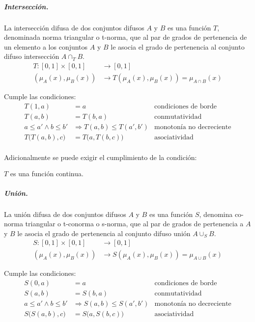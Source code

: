 \documentclass[a5paper,doc,10pt,noapacite]{apa6}
\begin{document}
{{\subparagraph{Intersección.}
La intersección difusa de dos conjuntos difusos \(A\) y \(B\) es una función \(T\), denominada norma triangular o t-norma, que al par de grados de pertenencia de un elemento a los conjuntos \(A\) y \(B\) le asocia el grado de pertenencia al conjunto difuso intersección \(A \cap _T B\).
    \begin{align*}
    T: [0,1] \times [0,1] & \longrightarrow [0,1]\\
    (\mu _A(x), \mu _B(x)) & \longrightarrow T(\mu _A(x), \mu _B(x)) = \mu_{A\cap B} (x)
    \end{align*}

Cumple las condiciones:
\begin{align*}
	T(1,a) &= a 		&	\text{condiciones de borde}	\\
	T(a,b) &= T(b,a) 	&	\text{conmutatividad}			\\
	a \leq a' \wedge b \leq b' &\Rightarrow T(a,b) \leq T(a',b')	&	\text{monotonía no decreciente}			\\
	T\big(T(a,b),c\big) &= T\big(a, T(b,c)\big)	&		\text{asociatividad}			\\
\end{align*}

    
Adicionalmente se puede exigir el cumplimiento de la condición:

\begin{center}
	\(T\) es una función continua.
\end{center}

\subparagraph{Unión.}

La unión difusa de dos conjuntos difusos \(A\) y \(B\) es una función \(S\), denomina co-norma triangular o t-conorma o s-norma, que al par de grados de pertenencia a \(A\) y \(B\) le asocia el grado de pertenencia al conjunto difuso unión  \(A \cup _S B\).
    \begin{align*}
    S: [0,1] \times [0,1] & \longrightarrow [0,1]\\
    (\mu _A(x), \mu _B(x)) & \longrightarrow S(\mu _A(x), \mu _B(x)) = \mu_{A\cup B} (x)
    \end{align*}

Cumple las condiciones:
\begin{align*}
	S(0,a) &= a 		&	\text{condiciones de borde}	\\
	S(a,b) &= S(b,a) 	&	\text{conmutatividad}			\\
	a \leq a' \wedge b \leq b' &\Rightarrow S(a,b) \leq S(a',b')	&	\text{monotonía no decreciente}			\\
	S\big(S(a,b),c\big) &= S\big(a, S(b,c)\big)	&		\text{asociatividad}			\\
\end{align*}
 
}}
\end{document}
